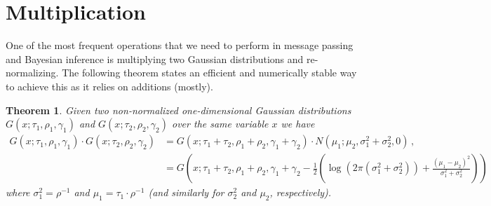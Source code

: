 \documentclass[a4paper]{article}
\newtheorem{thm}{Theorem}
\begin{document}
\section*{Multiplication}
One of the most frequent operations that we need to perform in message passing and Bayesian inference is multiplying two Gaussian distributions and re-normalizing. The following theorem states an efficient and numerically stable way to achieve this as it relies on additions (mostly).
\begin{thm} \label{thm:multiplication}
    Given two non-normalized one-dimensional Gaussian distributions $G(x;\tau_1,\rho_1,\gamma_1)$ and $G(x;\tau_2,\rho_2,\gamma_2)$ over the same variable $x$ we have
    \begin{align}
        G(x;\tau_1,\rho_1,\gamma_1) \cdot G(x;\tau_2,\rho_2,\gamma_2) & = G(x;\tau_1 + \tau_2,\rho_1 + \rho_2,\gamma_1+\gamma_2) \cdot N\left(\mu_1;\mu_2,\sigma_1^2+\sigma_2^2,0\right) \label{eq:gauss_mul}\,,                                                                                      \\
                                                                      & = G\left(x;\tau_1 + \tau_2,\rho_1 + \rho_2,\gamma_1+\gamma_2 - \frac{1}{2}\left(\log\left(2\pi \left(\sigma_1^2+\sigma_2^2\right)\right) + \frac{\left(\mu_1 - \mu_2\right)^2}{\sigma_1^2+\sigma_2^2}\right)\right) \nonumber
    \end{align}
    where $\sigma_1^2=\rho^{-1}$ and $\mu_1 = \tau_1\cdot\rho^{-1}$ (and similarly for $\sigma_2^2$ and $\mu_2$, respectively).
\end{thm}
\end{document}
